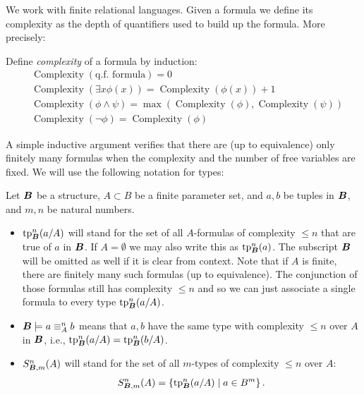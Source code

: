 \documentclass{amsart}
\DeclareMathOperator{\B}{\boldface B}
\DeclareMathOperator{\cx}{Complexity}
\newcommand{\curly}[1]{\left\{#1\right\}}
\begin{document}
We work with finite relational languages.
Given a formula we define its complexity as the depth of quantifiers used to build up the formula. More precisely:
\begin{Definition}
Define \emph{complexity} of a formula by induction:
\begin{align*}
	&\cx(\text{q.f. formula}) = 0 \\
	&\cx(\exists x \phi(x)) = \cx(\phi(x)) + 1 \\
	&\cx(\phi \wedge \psi) = \max(\cx(\phi), \cx(\psi)) \\
	&\cx(\neg \phi) = \cx(\phi)
\end{align*}
\end{Definition}
A simple inductive argument verifies that there are (up to equivalence) only finitely many formulas when the complexity and the number of free variables are fixed.
We will use the following notation for types:
\begin{Definition} Let $\B$ be a structure, $A \subset B$ be a finite parameter set, and $a,b$ be tuples in $\B$, and $m, n$ be natural numbers.
  \begin{itemize}
  \item $\tp^n_{\B}(a/A)$ will stand for the set of all $A$-formulas of complexity $\leq n$ that are true of $a$ in $\B$.
    If $A = \emptyset$ we may also write this as $\tp^n_{\B}(a)$.
    The subscript $\B$ will be omitted as well if it is clear from context.
    Note that if $A$ is finite, there are finitely many such formulas (up to equivalence).
    The conjunction of those formulas still has complexity $\leq n$ and so we can just associate a single formula to every type $\tp^n_{\B}(a/A)$.
  \item $\B \models a \equiv^n_A b$ means that $a,b$ have the same type with complexity $\leq n$ over $A$ in $\B$, i.e., $\tp^n_{\B}(a/A) = \tp^n_{\B}(b/A)$.
  \item $S^n_{\B, m}(A)$ will stand for the set of all $m$-types of complexity $\leq n$ over $A$:
    \begin{align*}
      S^n_{\B, m}(A) = \curly{\tp^n_{\B}(a/A) \mid a \in B^m}.
    \end{align*}
  \end{itemize}
\end{Definition}
\end{document}
